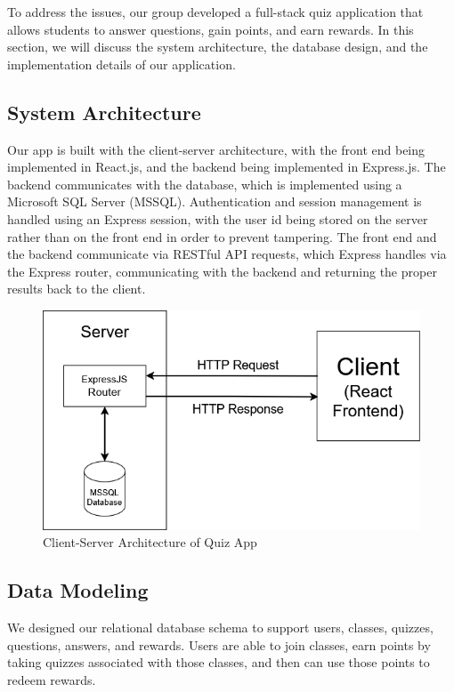 To address the issues, our group developed a full-stack quiz application that allows students to answer questions, gain points, and earn rewards. In this section, we will discuss the system architecture, the database design, and the implementation details of our application.
\subsection{System Architecture}
Our app is built with the client-server architecture, with the front end being implemented in React.js, and the backend being implemented in Express.js. The backend communicates with the database, which is implemented using a Microsoft SQL Server (MSSQL). Authentication and session management is handled using an Express session, with the user id being stored on the server rather than on the front end in order to prevent tampering. The front end and the backend communicate via RESTful API requests, which Express handles via the Express router, communicating with the backend and returning the proper results back to the client.
\begin{figure}[H]
    \centering
    \includegraphics[width=0.7\linewidth]{PUT INDIVIDUAL SECTIONS HERE/images/clientServer(2).png}
    \caption{Client-Server Architecture of Quiz App}
    \label{client-server}
\end{figure}

\subsection{Data Modeling}
We designed our relational database schema to support users, classes, quizzes, questions, answers, and rewards. Users are able to join classes, earn points by taking quizzes associated with those classes, and then can use those points to redeem rewards.

